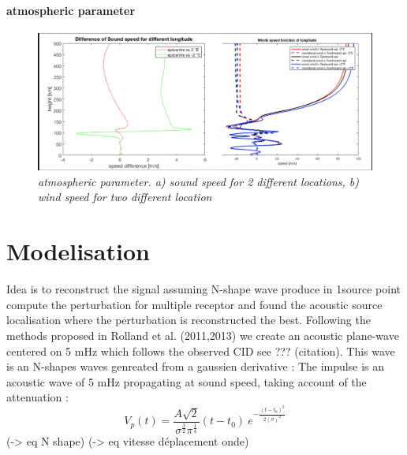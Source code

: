 \documentclass{gji}
\begin{document}
\paragraph{atmospheric parameter}
\begin{figure}
\begin{center}
\includegraphics[width=1\linewidth]{images/sound_wind_epiVS2deg.png}
\end{center}
\caption{ \textit{\emph{atmospheric parameter}. a) sound speed for 2 different locations, b) wind speed for two different location }} 

\label{atmos_param}
\end{figure}


\section{Modelisation} 
        Idea is to reconstruct the signal assuming N-shape wave produce in 1source point compute the perturbation for multiple receptor and found the acoustic source localisation where the perturbation is reconstructed the best. Following the methods proposed in Rolland et al. (2011,2013) we create an acoustic plane-wave centered on 5 mHz which follows the observed CID see ??? (citation). This wave is an N-shapes waves genreated from a gaussien derivative : 
      The impulse is an acoustic wave of 5 mHz propagating at sound speed, taking account of the attenuation 
      :\begin{equation}\label{fct_source}
V_p(t) = \frac{A\sqrt{2}}{\sigma^{\frac{3}{2}}\pi^{\frac{1}{4}}} (t-t_0) \ e^{-\frac{(t-t_0)^{2}}{2(\sigma)^{2}}} 
\end{equation}
        (-> eq N shape)
        (-> eq vitesse déplacement onde)
        
\end{document}
